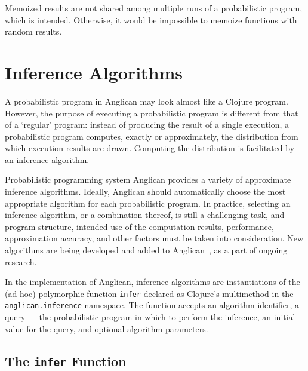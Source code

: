 \documentclass[preprint]{sigplanconf}
\begin{document}
Memoized results are not shared among multiple runs of a
probabilistic program, which is intended. Otherwise, it would be
impossible to memoize functions with random results.

\section{Inference Algorithms}
\label{sec:inference}

A probabilistic program in Anglican may look almost like a
Clojure program. However, the purpose of executing a
probabilistic program is different from that of a `regular'
program: instead of producing the result of a single execution,
a probabilistic program computes, exactly or approximately, the
distribution from which execution results are drawn.  Computing
the distribution is facilitated by an inference algorithm.

Probabilistic programming system Anglican provides a variety of
approximate inference algorithms. Ideally, Anglican should
automatically choose the most appropriate algorithm for each
probabilistic program. In practice, selecting an inference
algorithm, or a combination thereof, is still a challenging
task, and program structure, intended use of the computation
results, performance, approximation accuracy, and other factors
must be taken into consideration. New algorithms are being
developed and added to Anglican~\cite{TMP+15,MPT+16,RNL+2016},
as a part of ongoing research.

In the implementation of Anglican, inference algorithms are
instantiations of the (ad-hoc) polymorphic function
\texttt{infer} declared as Clojure's multimethod in the
\texttt{anglican.{\linebreak[0]}inference} namespace. The function accepts an
algorithm identifier, a query --- the probabilistic program in
which to perform the inference, an initial value for the query,
and optional algorithm parameters.

\subsection{The \texttt{infer} Function}
\label{sec:infer}
\end{document}
